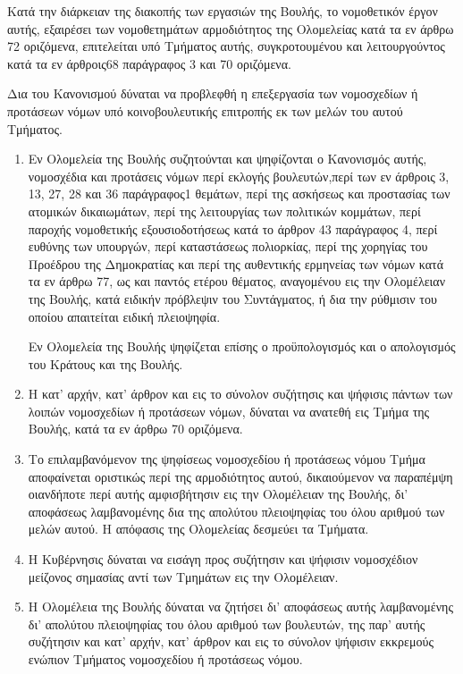 \documentclass[twoside, a4paper, 10pt]{article}
\begin{document}
\begin{multicols}{2}
\begin{enumerate}
\begin{BigQuote}
Κατά την διάρκειαν της διακοπής των εργασιών της Βουλής, το νομοθετικόν έργον αυτής, εξαιρέσει των νομοθετημάτων αρμοδιότητος της Ολομελείας κατά τα εν άρθρω 72 οριζόμενα, επιτελείται υπό Τμήματος αυτής, συγκροτουμένου και λειτουργούντος κατά τα εν άρθροις68 παράγραφος 3 και 70 οριζόμενα.

	Δια του Κανονισμού δύναται να προβλεφθή η επεξεργασία των νομοσχεδίων ή προτάσεων νόμων υπό κοινοβουλευτικής επιτροπής εκ των μελών του αυτού Τμήματος.

\begin{enumerate}
  \item[1.] Εν Ολομελεία της Βουλής συζητούνται και ψηφίζονται ο Κανονισμός αυτής, νομοσχέδια και προτάσεις νόμων περί εκλογής βουλευτών,περί των εν άρθροις 3, 13, 27, 28 και 36 παράγραφος1 θεμάτων, περί της ασκήσεως και προστασίας των ατομικών δικαιωμάτων, περί της λειτουργίας των πολιτικών κομμάτων, περί παροχής νομοθετικής εξουσιοδοτήσεως κατά το άρθρον 43 παράγραφος 4, περί ευθύνης των υπουργών, περί καταστάσεως πολιορκίας, περί της χορηγίας του Προέδρου της Δημοκρατίας και περί της αυθεντικής ερμηνείας των νόμων κατά τα  εν άρθρω 77, ως και παντός ετέρου θέματος, αναγομένου εις την Ολομέλειαν της Βουλής, κατά ειδικήν πρόβλεψιν του Συντάγματος, ή δια την ρύθμισιν του οποίου απαιτείται ειδική πλειοψηφία.

	Εν Ολομελεία της Βουλής ψηφίζεται επίσης ο προϋπολογισμός και ο απολογισμός του Κράτους και της Βουλής.
  \item[2.] Η κατ' αρχήν, κατ' άρθρον και εις το σύνολον συζήτησις και ψήφισις πάντων των λοιπών νομοσχεδίων ή προτάσεων νόμων, δύναται να ανατεθή εις Τμήμα της Βουλής, κατά τα εν άρθρω 70 οριζόμενα.
  \item[3.] Το επιλαμβανόμενον της ψηφίσεως νομοσχεδίου ή προτάσεως νόμου Τμήμα αποφαίνεται οριστικώς περί της αρμοδιότητος αυτού, δικαιούμενον να παραπέμψη οιανδήποτε περί αυτής αμφισβήτησιν εις την Ολομέλειαν της Βουλής, δι' αποφάσεως λαμβανομένης δια της απολύτου πλειοψηφίας του όλου αριθμού των μελών αυτού. Η απόφασις της Ολομελείας δεσμεύει τα Τμήματα.
  \item[4.] Η Κυβέρνησις δύναται να εισάγη προς συζήτησιν και ψήφισιν νομοσχέδιον μείζονος σημασίας αντί των Τμημάτων εις την Ολομέλειαν.
  \item[5.] Η Ολομέλεια της Βουλής δύναται να ζητήσει δι' αποφάσεως  αυτής λαμβανομένης δι' απολύτου πλειοψηφίας του όλου αριθμού των βουλευτών, της παρ' αυτής συζήτησιν και κατ' αρχήν, κατ' άρθρον και εις το σύνολον ψήφισιν εκκρεμούς ενώπιον Τμήματος νομοσχεδίου ή προτάσεως νόμου.
\end{enumerate}


\end{BigQuote}
\end{enumerate}
\end{multicols}
\end{document}
